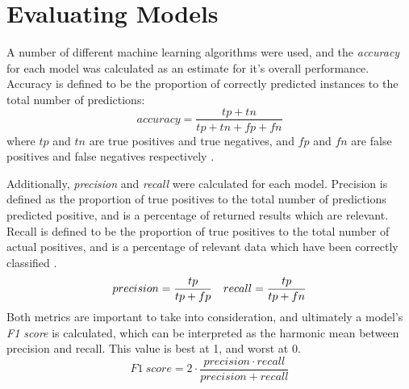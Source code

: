 \section{Evaluating Models} \label{evalmodels}
A number of different machine learning algorithms were used, and the \textit{accuracy} for each model was calculated as an estimate for it's overall performance. Accuracy is defined to be the proportion of correctly predicted instances to the total number of predictions:
$$
accuracy = \frac{tp+tn}{tp+tn+fp+fn}
$$
where $tp$ and $tn$ are true positives and true negatives, and $fp$ and $fn$ are false positives and false negatives respectively \cite{vanwinckelen2012estimating}.

Additionally, \textit{precision} and \textit{recall} were calculated for each model. Precision is defined as the proportion of true positives to the total number of predictions predicted positive, and is a percentage of returned results which are relevant. Recall is defined to be the proportion of true positives to the total number of actual positives, and is a percentage of relevant data which have been correctly classified \cite{buckland1994relationship}.
$$
precision = \frac{tp}{tp+fp} \\
\quad recall = \frac{tp}{tp+fn}
$$
Both metrics are important to take into consideration, and ultimately a model's \textit{F1 score} is calculated, which can be interpreted as the harmonic mean between precision and recall. This value is best at 1, and worst at 0.
$$
F1 \ score = 2 \cdot \frac{precision \cdot recall}{precision + recall}
$$

